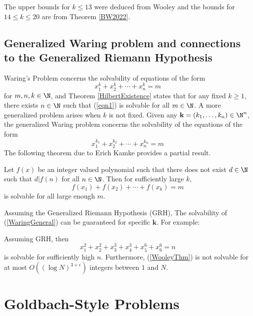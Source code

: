 The upper bounds for $k\le13$ were deduced from Wooley \cite{Wooley_2016} and the bounds for $14\le k\le 20$ are from Theorem \ref{BW2022}.

\subsection{Generalized Waring problem and connections to the Generalized Riemann Hypothesis}

Waring's Problem concerns the solvability of equations of the form
\begin{equation}
    x_1^k+x_2^k+\cdots+x_n^k=m \label{eqn1}
\end{equation}
for $m,n,k\in\N$, and Theorem \ref{HilbertExistence} states that for any fixed $k\ge1$, there exists $n\in \N$ such that (\ref{eqn1}) is solvable for all $m\in\N$. A more generalized problem arises when $k$ is not fixed. Given any $\mathbf k=(k_1,\dots,k_n)\in\N^n$, the generalized Waring problem concerns the solvability of the equations of the form
\begin{equation}
    x_1^{k_1}+x_2^{k_2}+\cdots+x_n^{k_n}=m\label{WaringGeneral}
\end{equation}
The following theorem due to Erich Kamke provides a partial result.

\begin{theorem}[Kamke]
    Let $f(x)$ be an integer valued polynomial such that there does not exist $d\in\N$ such that $d|f(n)$ for all $n\in\N$. Then for sufficiently large $k$,
    $$f(x_1)+f(x_2)+\cdots+f(x_k)=m$$
    is solvable for all large enough $m$.
\end{theorem}

Assuming the Generalized Riemann Hypothesis (GRH), The solvability of (\ref{WaringGeneral}) can be guaranteed for specific $\mathbf k$. For example:

\begin{theorem}[Wooley]
    Assuming GRH, then
    \begin{equation}
        x_1^2+x_2^2+x_3^3+x_4^3+x_5^6+x_6^6=n \label{WooleyThm}
    \end{equation}
    is solvable for sufficiently high $n$. Furthermore, (\ref{WooleyThm}) is not solvable for at most $O((\log N)^{3+\epsilon})$ integers between $1$ and $N$.
\end{theorem}

\section{Goldbach-Style Problems}

